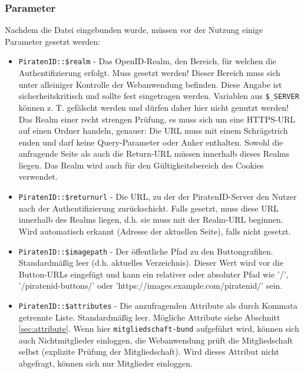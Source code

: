 \subsubsection{Parameter}
Nachdem die Datei eingebunden wurde, müssen vor der Nutzung einige Parameter gesetzt werden:
\begin{itemize}
	\item \texttt{PiratenID::\$realm} - Das OpenID-Realm, den Bereich, für welchen die Authentifizierung erfolgt. Muss gesetzt werden!
										Dieser Bereich muss sich unter alleiniger Kontrolle der Webanwendung befinden.
										Diese Angabe ist sicherheitskritisch und sollte fest eingetragen werden.
										Variablen aus \texttt{\$\_SERVER} können z. T. gefälscht werden und dürfen daher hier nicht genutzt werden!
										Das Realm einer recht strengen Prüfung, es muss sich um eine HTTPS-URL auf einen Ordner handeln, genauer:
										Die URL muss mit einem Schrägstrich enden und darf keine Query-Parameter oder Anker enthalten.
										Sowohl die anfragende Seite als auch die Return-URL müssen innerhalb dieses Realms liegen.
										Das Realm wird auch für den Gültigkeitsbereich des Cookies verwendet.
										
	\item \texttt{PiratenID::\$returnurl} - Die URL, zu der der PiratenID-Server den Nutzer nach der Authentifizierung zurückschickt.
											Falls gesetzt, muss diese URL innerhalb des Realms liegen, d.h. sie muss mit der Realm-URL beginnen.
											Wird automatisch erkannt (Adresse der aktuellen Seite), falls nicht gesetzt.

	\item \texttt{PiratenID::\$imagepath} - Der öffentliche Pfad zu den Buttongrafiken. Standardmäßig leer (d.h. aktuelles Verzeichnis).
											Dieser Wert wird vor die Button-URLs eingefügt und kann ein relativer oder absoluter Pfad wie '/',
											'/piratenid-buttons/' oder 'https://images.example.com/piratenid/' sein.

	\item \texttt{PiratenID::\$attributes} - Die anzufragenden Attribute als durch Kommata getrennte Liste. Standardmäßig leer.
											Mögliche Attribute siehe Abschnitt \ref{sec:attribute}.
											Wenn hier  \texttt{mitgliedschaft-bund} aufgeführt wird, können sich auch Nichtmitglieder einloggen,
											die Webanwendung prüft die Mitgliedschaft selbst (explizite Prüfung der Mitgliedschaft).
											Wird dieses Attribut nicht abgefragt, können sich nur Mitglieder einloggen.


\end{itemize}
